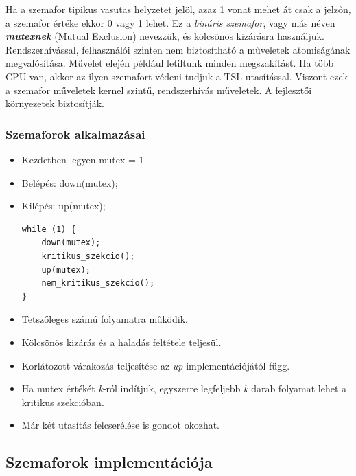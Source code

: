 \documentclass[tikz,12pt,margin=0px]{article}
\begin{document}
    \noindent Ha a szemafor tipikus vasutas helyzetet jelöl, azaz 1 vonat mehet át csak a jelzőn, a szemafor értéke ekkor 0 vagy 1 lehet. Ez a \textit{bináris szemafor}, vagy más néven \textbf{\emph{mutexnek}} (Mutual Exclusion) nevezzük, és kölcsönös kizárásra használjuk. \\

    \noindent Rendszerhívással, felhasználói szinten nem biztosítható a műveletek atomiságának megvalósítása. Művelet elején például letiltunk minden megszakítást. Ha több CPU van, akkor az ilyen szemafort védeni tudjuk a TSL utasítással. Viszont ezek a szemafor műveletek kernel szintű, rendszerhívás műveletek. A fejlesztői környezetek biztosítják.

    \subsubsection*{Szemaforok alkalmazásai}

    \begin{itemize}[topsep=8pt,itemsep=4pt,partopsep=4pt, parsep=4pt]
        \item Kezdetben legyen mutex = 1.
        \item Belépés: down(mutex);
        \item Kilépés: up(mutex);
        \begin{verbatim}
while (1) {
    down(mutex);
    kritikus_szekcio();
    up(mutex);
    nem_kritikus_szekcio();
}
        \end{verbatim}
        \item Tetszőleges számú folyamatra működik.
        \item Kölcsönös kizárás és a haladás feltétele teljesül.
        \item Korlátozott várakozás teljesítése az \emph{up} implementációjától függ.
        \item Ha mutex értékét \emph{k}-ról indítjuk, egyszerre legfeljebb \emph{k} darab folyamat lehet a kritikus szekcióban.
        \item Már két utasítás felcserélése is gondot okozhat.
    \end{itemize}

    \subsection*{Szemaforok implementációja}
\end{document}
